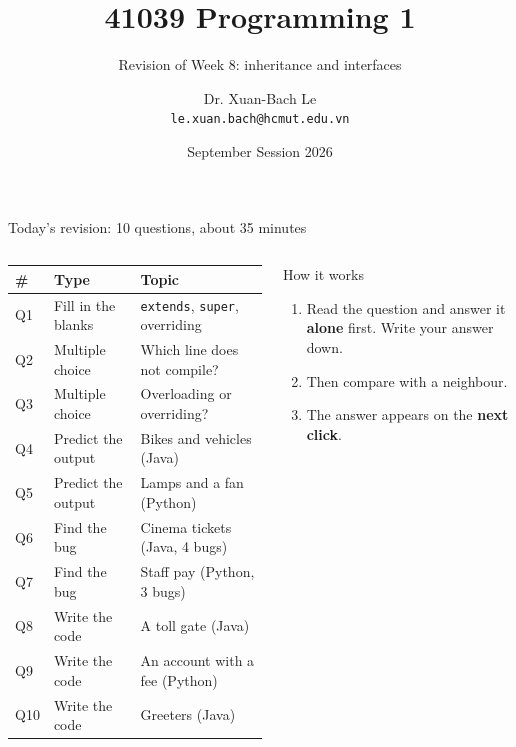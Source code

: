 \documentclass[aspectratio=169]{beamer}
\title[41039 Programming 1 --- Revision of Week 8]{41039 Programming 1}
\subtitle{Revision of Week 8: inheritance and interfaces}
\author{Dr. Xuan-Bach Le\\ \small\texttt{le.xuan.bach@hcmut.edu.vn}}
\institute{\small Faculty of Computer Science and Engineering, HCMUT}
\date{September Session 2026}
\newcommand{\code}[1]{\texttt{#1}}
\begin{document}
\begin{frame}[plain]
  \titlepage
\end{frame}

\begin{frame}{Today's revision: 10 questions, about 35 minutes}
  \begin{columns}[T,onlytextwidth]
    {\small
    \renewcommand{\arraystretch}{1.18}
    \begin{tabular}{@{}l@{\hspace{0.8em}}l@{\hspace{0.8em}}l@{}}
      \toprule
      \textbf{\#} & \textbf{Type} & \textbf{Topic}\\
      \midrule
      Q1  & Fill in the blanks & \code{extends}, \code{super}, overriding\\
      Q2  & Multiple choice    & Which line does not compile?\\
      Q3  & Multiple choice    & Overloading or overriding?\\
      Q4  & Predict the output & Bikes and vehicles (Java)\\
      Q5  & Predict the output & Lamps and a fan (Python)\\
      Q6  & Find the bug       & Cinema tickets (Java, 4 bugs)\\
      Q7  & Find the bug       & Staff pay (Python, 3 bugs)\\
      Q8  & Write the code     & A toll gate (Java)\\
      Q9  & Write the code     & An account with a fee (Python)\\
      Q10 & Write the code     & Greeters (Java)\\
      \bottomrule
    \end{tabular}}
    \begin{discussionbox}{How it works}
      \small\raggedright
      \begin{enumerate}[itemsep=0.3em, topsep=0.1em, leftmargin=1.2em]
        \item Read the question and answer it \textbf{alone} first. Write your answer
              down.
        \item Then compare with a neighbour.
        \item The answer appears on the \textbf{next click}.
      \end{enumerate}
    \end{discussionbox}
  \end{columns}
\end{frame}
\end{document}
